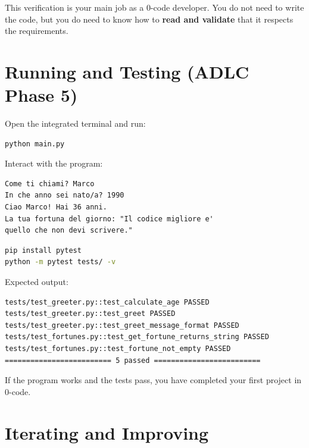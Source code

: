 \begin{tipbox}
This verification is your main job as a 0-code developer. You do not need to write the code, but you do need to know how to \textbf{read and validate} that it respects the requirements.
\end{tipbox}

\section{Running and Testing (ADLC Phase 5)}

\begin{praticabox}[title={Hands-on --- Running the program}]
Open the integrated terminal and run:
\begin{lstlisting}[language=bash]
python main.py
\end{lstlisting}
Interact with the program:
\begin{lstlisting}[language={}]
Come ti chiami? Marco
In che anno sei nato/a? 1990
Ciao Marco! Hai 36 anni.
La tua fortuna del giorno: "Il codice migliore e'
quello che non devi scrivere."
\end{lstlisting}
\end{praticabox}

\begin{praticabox}[title={Hands-on --- Running the tests}]
\begin{lstlisting}[language=bash]
pip install pytest
python -m pytest tests/ -v
\end{lstlisting}
Expected output:
\begin{lstlisting}[language={}]
tests/test_greeter.py::test_calculate_age PASSED
tests/test_greeter.py::test_greet PASSED
tests/test_greeter.py::test_greet_message_format PASSED
tests/test_fortunes.py::test_get_fortune_returns_string PASSED
tests/test_fortunes.py::test_fortune_not_empty PASSED
========================= 5 passed =========================
\end{lstlisting}
\end{praticabox}

\begin{checkpointbox}
If the program works and the tests pass, you have completed your first project in 0-code.
\end{checkpointbox}

\section{Iterating and Improving}

